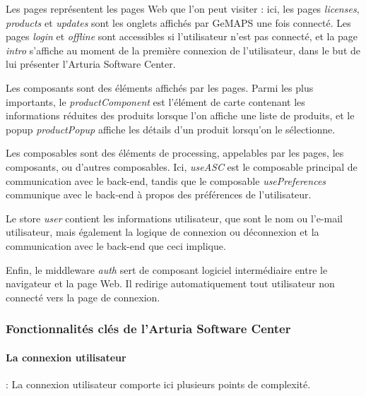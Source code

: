\documentclass[francais]{rapportPFE}  %
\begin{document}
Les pages représentent les pages Web que l'on peut visiter : ici, les pages \textit{licenses}, \textit{products} et \textit{updates} sont les onglets affichés par GeMAPS une fois connecté. Les pages \textit{login} et \textit{offline} sont accessibles si l'utilisateur n'est pas connecté, et la page \textit{intro} s'affiche au moment de la première connexion de l'utilisateur, dans le but de lui présenter l'Arturia Software Center.

Les composants sont des éléments affichés par les pages. Parmi les plus importants, le \textit{productComponent} est l'élément de carte contenant les informations réduites des produits lorsque l'on affiche une liste de produits, et le popup \textit{productPopup} affiche les détails d'un produit lorsqu'on le sélectionne.

Les composables sont des éléments de processing, appelables par les pages, les composants, ou d'autres composables. Ici, \textit{useASC} est le composable principal de communication avec le back-end, tandis que le composable \textit{usePreferences} communique avec le back-end à propos des préférences de l'utilisateur.

Le store \textit{user} contient les informations utilisateur, que sont le nom ou l'e-mail utilisateur, mais également la logique de connexion ou déconnexion et la communication avec le back-end que ceci implique.

Enfin, le middleware \textit{auth} sert de composant logiciel intermédiaire entre le navigateur et la page Web. Il redirige automatiquement tout utilisateur non connecté vers la page de connexion.



\subsubsection{Fonctionnalités clés de l'Arturia Software Center}

\paragraph{La connexion utilisateur}: La connexion utilisateur comporte ici plusieurs points de complexité. 
\end{document}
